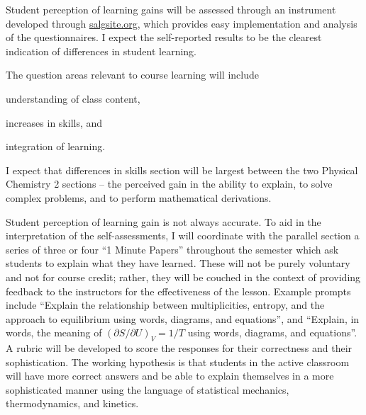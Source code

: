 \documentclass[10pt,letterpaper]{article}
\begin{document}
%
%


Student perception of learning gains will be assessed through an instrument developed through \url{salgsite.org}, which provides easy implementation and analysis of the questionnaires. I expect the self-reported results to be the clearest indication of differences in student learning. 

The question areas relevant to course learning will include
\begin{enumerate*}[label=\textbf{\arabic*.)}]
  \item understanding of class content,
\item increases in skills, and
\item integration of learning.
\end{enumerate*}
I expect that differences in skills section will be largest between the two Physical Chemistry 2 sections -- the perceived gain in the ability to explain, to solve complex problems, and to perform mathematical derivations. 

 Student perception of learning gain is not always accurate. To aid in the interpretation of the self-assessments, I will coordinate with the parallel section a series of three or four ``1 Minute Papers'' throughout the semester which ask students to explain what they have learned. These will not be purely voluntary and not for course credit; rather, they will be couched in the context of providing feedback to the instructors for the effectiveness of the lesson. Example prompts include ``Explain the relationship between multiplicities, entropy, and the approach to equilibrium using words, diagrams, and equations'', and ``Explain, in words, the meaning of $(\partial S/\partial U)_V = 1/T$ using words, diagrams, and equations''. A rubric will be developed to score the responses for their correctness and their sophistication. The working hypothesis is that students in the active classroom will have more correct answers and be able to explain themselves in a more sophisticated manner using the language of statistical mechanics, thermodynamics, and kinetics.
\end{document}
